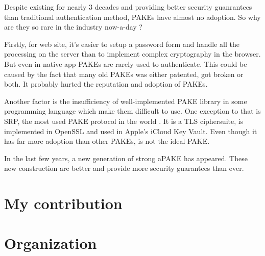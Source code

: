 \documentclass[../report.tex]{subfiles}
\begin{document}
Despite existing for nearly 3 decades and providing better security guanrantees than traditional authentication method, PAKEs have almost no adoption. So why are they so rare in the industry now-a-day ?

Firstly, for web site, it's easier to setup a password form and handle all the processing on the server than to implement complex cryptography in the browser. But even in native app PAKEs are rarely used to authenticate.
This could be caused by the fact that many old PAKEs was either patented, got broken or both. %
It probably hurted the reputation and adoption of PAKEs.

Another factor is the insufficiency of well-implemented PAKE library in some programming language %
which make them difficult to use.
One exception to that is SRP, the most used PAKE protocol in the world \cite{PAKE_Green_blog}.
It is a TLS ciphersuite, is implemented in OpenSSL and used in Apple's iCloud Key Vault. Even though it has far more adoption than other PAKEs, is not the ideal PAKE.


In the last few years, a new generation of strong aPAKE \cite{OPAQUE_Paper, KHAPE_Paper} has appeared. These new construction are better and provide more security guarantees than ever.




\section{My contribution}
\section{Organization}
\end{document}
